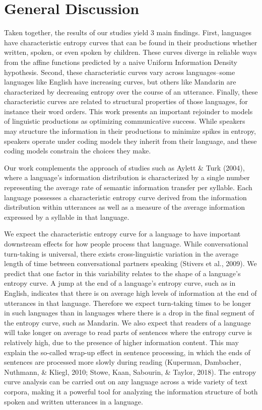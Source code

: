 \documentclass[10pt, letterpaper]{article}
\begin{document}
\section{General Discussion}\label{general-discussion}

Taken together, the results of our studies yield 3 main findings. First,
languages have characteristic entropy curves that can be found in their
productions whether written, spoken, or even spoken by children. These
curves diverge in reliable ways from the affine functions predicted by a
naive Uniform Information Density hypothesis. Second, these
characteristic curves vary across languages--some languages like English
have increasing curves, but others like Mandarin are characterized by
decreasing entropy over the course of an utterance. Finally, these
characteristic curves are related to structural properties of those
languages, for instance their word orders. This work presents an
important rejoinder to models of linguistic productions as optimizing
communicative success. While speakers may structure the information in
their productions to minimize spikes in entropy, speakers operate under
coding models they inherit from their language, and these coding models
constrain the choices they make.

Our work complements the approach of studies such as Aylett \& Turk
(2004), where a language's information distribution is characterized by
a single number representing the average rate of semantic information
transfer per syllable. Each language possesses a characteristic entropy
curve derived from the information distribution within utterances as
well as a measure of the average information expressed by a syllable in
that language.

We expect the characteristic entropy curve for a language to have
important downstream effects for how people process that language. While
conversational turn-taking is universal, there exists cross-linguistic
variation in the average length of time between conversational partners
speaking (Stivers et al., 2009). We predict that one factor in this
variability relates to the shape of a language's entropy curve. A jump
at the end of a language's entropy curve, such as in English, indicates
that there is on average high levels of information at the end of
utterances in that language. Therefore we expect turn-taking times to be
longer in such languages than in languages where there is a drop in the
final segment of the entropy curve, such as Mandarin. We also expect
that readers of a language will take longer on average to read parts of
sentences where the entropy curve is relatively high, due to the
presence of higher information content. This may explain the so-called
wrap-up effect in sentence processing, in which the ends of sentences
are processed more slowly during reading (Kuperman, Dambacher, Nuthmann,
\& Kliegl, 2010; Stowe, Kaan, Sabourin, \& Taylor, 2018). The entropy
curve analysis can be carried out on any language across a wide variety
of text corpora, making it a powerful tool for analyzing the information
structure of both spoken and written utterances in a language.
\end{document}
